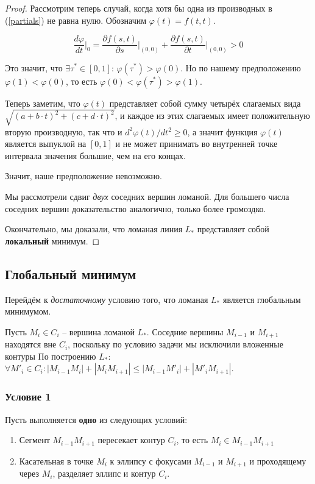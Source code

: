 \documentclass[10pt]{SPIIRAS_Proceedings}
\begin{document}
\begin{proof}
Рассмотрим теперь случай,
когда хотя бы одна из производных в
(\ref{partials})
не равна нулю.
Обозначим
$\varphi(t)=f(t,t)$.

$$
\frac{d\varphi}{dt} \Big|_0 =
\frac{\partial f(s,t)}{\partial s} \Big|_{(0,0)}
+
\frac{\partial f(s,t)}{\partial t} \Big|_{(0,0)}
>0
$$

Это значит, что
$\exists \tau^* \in [0,1]$:
$\varphi(\tau^*) > \varphi(0)$.
Но по нашему предположению
$\varphi(1)<\varphi(0)$,
то есть
$\varphi(0)<\varphi(\tau^*)>\varphi(1)$.

Теперь заметим, что
$\varphi(t)$
представляет собой сумму четырёх слагаемых вида
$\sqrt{(a+b\cdot t)^2 + (c+d \cdot t)^2}$,
и каждое из этих слагаемых имеет
положительную вторую производную,
так что и
$d^2\varphi(t)/dt^2 \geqslant 0$,
а значит функция
$\varphi(t)$
является выпуклой на
$[0,1]$
и не может принимать
во внутренней точке интервала
значения большие,
чем на его концах.

Значит,
наше предположение невозможно.

Мы рассмотрели сдвиг \textit{двух}
соседних вершин ломаной.
Для большего числа соседних вершин
доказательство аналогично,
только более громоздко.

Окончательно,
мы доказали, что ломаная линия
$L_*$
представляет собой
\textbf{локальный}
минимум.
\end{proof}

\subsection{Глобальный минимум}

Перейдём к \textit{достаточному}
условию того,
что ломаная
$L_*$
является глобальным минимумом.

Пусть
$M_i \in C_i$ --
вершина ломаной
$L_*$.
Соседние вершины
$M_{i-1}$
и
$M_{i+1}$
находятся вне
$C_i$,
поскольку по условию задачи
мы исключили вложенные контуры
По построению
$L_*$:
$\forall M'_i \in C_i:
|M_{i-1} M_i|+|M_i M_{i+1}|
\leqslant
|M_{i-1} M'_i|+|M'_i M_{i+1}|
$.

\subsubsection*{Условие 1}

Пусть выполняется
\textbf{одно}
из следующих условий:
\begin{enumerate}
  \item
  Сегмент
  $M_{i-1} M_{i+1}$
  пересекает контур
  $C_i$,
  то есть
  $M_i \in M_{i-1} M_{i+1}$
  \item
  Касательная в точке
  $M_i$
  к эллипсу с фокусами
  $M_{i-1}$
  и
  $M_{i+1}$
  и проходящему через
  $M_i$,
  разделяет эллипс и контур
  $C_i$.
\end{enumerate}
\end{document}
